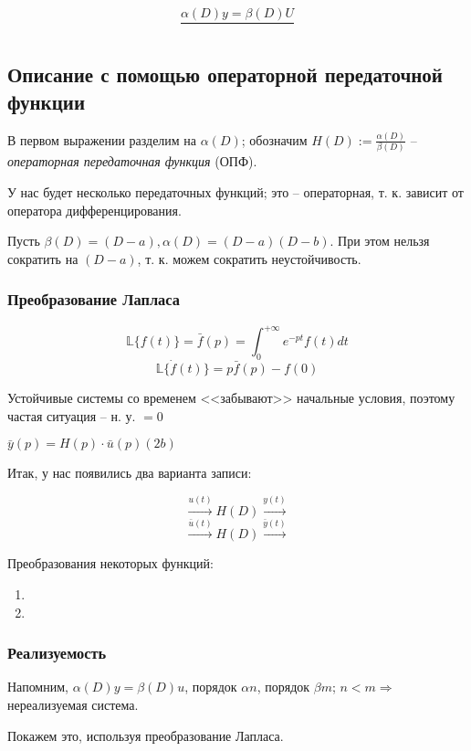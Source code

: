 \documentclass[main.tex]{subfiles}
\begin{document}
$$ \frac{\alpha(D)y = \beta(D)U}{ } $$ %

\subsection{Описание с помощью операторной передаточной функции}

В первом выражении разделим на $ \alpha(D) $; обозначим $ H(D) := \frac{\alpha(D)}{\beta(D)} $ -- \emph{операторная передаточная функция} (ОПФ).

У нас будет несколько передаточных функций; это -- операторная, т. к. зависит от оператора дифференцирования.

Пусть $ \beta(D) = (D - a), \alpha(D) = (D-a)(D-b) $.
При этом нельзя сократить на $ (D - a) $, т. к. можем сократить неустойчивость. %

\subsubsection{Преобразование Лапласа}

$$ \mathds{L}\{f(t)\} = \bar{f}(p) = \int_0^{+\infty} e^{-pt} f(t) dt $$
$$ \mathds{L}\{\dot f (t)\} = p \bar{f}(p)- f(0) $$

Устойчивые системы со временем <<забывают>> начальные условия, поэтому частая ситуация -- н. у. $= 0$


$ \boxed{\bar{y}(p) = H(p) \cdot \bar{u}(p) }  (2b) $ %

Итак, у нас появились два варианта записи:

$$ \xrightarrow{u(t)} \boxed{H(D)}\xrightarrow{y(t)} $$
$$ \xrightarrow{\bar u(t)} \boxed{H(D)} \xrightarrow{ \bar y(t)} $$

Преобразования некоторых функций: %

\begin{enumerate}[noitemsep]
    \item
    \item
\end{enumerate}

\subsubsection{Реализуемость}

Напомним, $ \alpha(D)y = \beta(D) u $, порядок $ \alpha n $, порядок $ \beta m $; $ n < m \Rightarrow $ нереализуемая система.

Покажем это, используя преобразование Лапласа.
\end{document}
